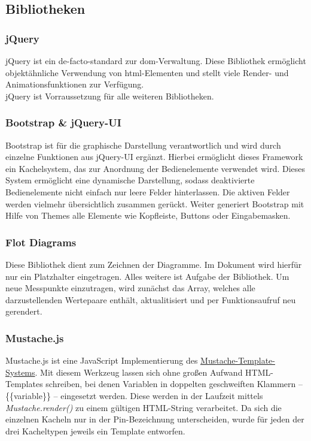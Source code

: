 \subsection{Bibliotheken}

\subsubsection{jQuery}
jQuery ist ein \gls{de-facto-standard} zur \gls{dom}-Verwaltung. Diese Bibliothek ermöglicht objektähnliche Verwendung von \gls{html}-Elementen und stellt viele Render- und Animationsfunktionen zur Verfügung.\\

jQuery ist Vorraussetzung für alle weiteren Bibliotheken.


\subsubsection{Bootstrap \& jQuery-UI}
Bootstrap ist für die graphische Darstellung verantwortlich und wird durch einzelne Funktionen aus jQuery-UI ergänzt. Hierbei ermöglicht dieses Framework ein Kachelsystem, das zur Anordnung der Bedienelemente verwendet wird. Dieses System ermöglicht eine dynamische Darstellung, sodass deaktivierte Bedienelemente nicht einfach nur leere Felder hinterlassen. Die aktiven Felder werden vielmehr übersichtlich zusammen gerückt. Weiter generiert Bootstrap mit Hilfe von Themes alle Elemente wie Kopfleiste, Buttons oder Eingabemasken.\\


\subsubsection{Flot Diagrams}
Diese Bibliothek dient zum Zeichnen der Diagramme. Im Dokument wird hierfür nur ein Platzhalter eingetragen. Alles weitere ist Aufgabe der Bibliothek. Um neue Messpunkte einzutragen, wird zunächst das Array, welches alle darzustellenden Wertepaare enthält, aktualitisiert und per Funktionsaufruf neu gerendert.


\subsubsection{Mustache.js}
Mustache.js ist eine JavaScript Implementierung des \href{http://mustache.github.io/}{Mustache-Template-Systems}. Mit diesem Werkzeug lassen sich ohne großen Aufwand HTML-Templates schreiben, bei denen Variablen in doppelten geschweiften Klammern -- \{\{variable\}\} -- eingesetzt werden. Diese werden in der Laufzeit mittels \textit{Mustache.render()} zu einem gültigen HTML-String verarbeitet. Da sich die einzelnen Kacheln nur in der Pin-Bezeichnung unterscheiden, wurde für jeden der drei Kacheltypen jeweils ein Template entworfen.